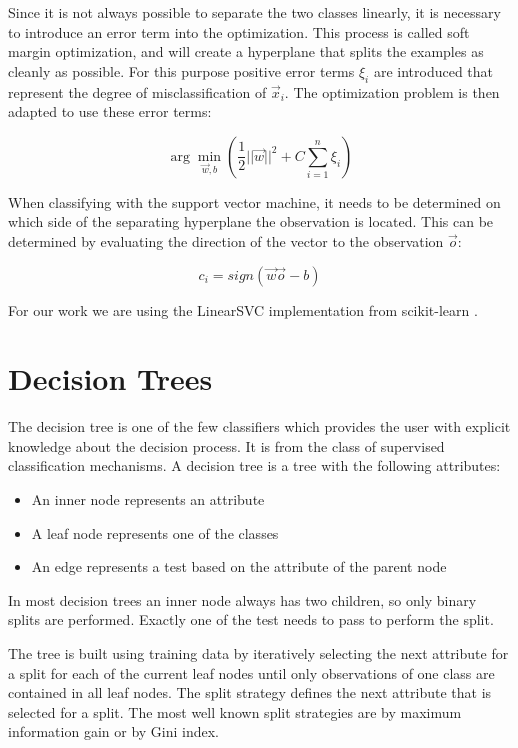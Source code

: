 \documentclass[pdftex,12pt,a4paper]{report}
\begin{document}
Since it is not always possible to separate the two classes linearly, it is necessary to introduce an error term into the optimization. This process is called soft margin optimization, and will create a hyperplane that splits the examples as cleanly as possible. For this purpose positive error terms $\xi_i$ are introduced that represent the degree of misclassification of $\vec{x}_i$. The optimization problem is then adapted to use these error terms:

\begin{equation}
\arg\min_{\vec{w}, b} \left(\frac{1}{2} ||\vec{w}||^2 + C \sum_{i=1}^{n} \xi_i \right)
\end{equation}

When classifying with the support vector machine, it needs to be determined on which side of the separating hyperplane the observation is located. This can be determined by evaluating the direction of the vector to the observation $\vec{o}$:

\begin{equation}
c_i = sign(\vec{w} \vec{o} - b)
\end{equation}

For our work we are using the LinearSVC implementation from scikit-learn \cite{pedregosa2011scikit}.

\section{Decision Trees}
\label{sec:basics-decision-trees}

The decision tree is one of the few classifiers which provides the user with explicit knowledge about the decision process. It is from the class of supervised classification mechanisms. A decision tree is a tree with the following attributes:

\begin{itemize}
	\item An inner node represents an attribute
	\item A leaf node represents one of the classes
	\item An edge represents a test based on the attribute of the parent node
\end{itemize}

In most decision trees an inner node always has two children, so only binary splits are performed. Exactly one of the test needs to pass to perform the split.

The tree is built using training data by iteratively selecting the next attribute for a split for each of the current leaf nodes until only observations of one class are contained in all leaf nodes. The split strategy defines the next attribute that is selected for a split. The most well known split strategies are by maximum information gain or by Gini index.
\end{document}
